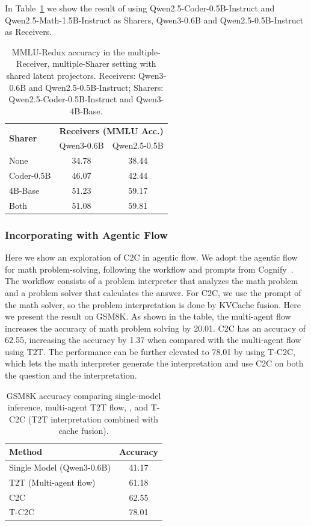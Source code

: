 In Table~\ref{tab:mrms} we show the result of using Qwen2.5-Coder-0.5B-Instruct and Qwen2.5-Math-1.5B-Instruct as Sharers, Qwen3-0.6B and Qwen2.5-0.5B-Instruct as Receivers.

\begin{table}[t]
\centering
\caption{MMLU-Redux accuracy in the multiple-Receiver, multiple-Sharer setting with shared latent projectors. Receivers: Qwen3-0.6B and Qwen2.5-0.5B-Instruct; Sharers: Qwen2.5-Coder-0.5B-Instruct and Qwen3-4B-Base.}
\label{tab:mrms}
\begin{tabular}{l|cc}
\toprule
\multirow{2}{*}{\textbf{Sharer}} & \multicolumn{2}{c}{\textbf{Receivers (MMLU Acc.)}} \\
 & Qwen3-0.6B & Qwen2.5-0.5B \\
\midrule
None & 34.78 & 38.44 \\
Coder-0.5B & 46.07 & 42.44 \\
4B-Base & 51.23 & 59.17 \\
Both & 51.08 & 59.81 \\
\bottomrule
\end{tabular}
\end{table}

\subsubsection{Incorporating with Agentic Flow}
\label{sec:appendix/agentic}

Here we show an exploration of C2C in agentic flow. We adopt the agentic flow for math problem-solving, following the workflow and prompts from Cognify~\citep{he2025cognify}. The workflow consists of a problem interpreter that analyzes the math problem and a problem solver that calculates the answer. For C2C, we use the prompt of the math solver, so the problem interpretation is done by KVCache fusion. Here we present the result on GSM8K. As shown in the table, the multi-agent flow increases the accuracy of math problem solving by 20.01. C2C has an accuracy of 62.55, increasing the accuracy by 1.37 when compared with the multi-agent flow using T2T. The performance can be further elevated to 78.01 by using T-C2C, which lets the math interpreter generate the interpretation and use C2C on both the question and the interpretation. 


\begin{table}[t]
\centering
\caption{GSM8K accuracy comparing single-model inference, multi-agent T2T flow, \name, and T-C2C (T2T interpretation combined with \name cache fusion).}
\label{tab:agentic}
\begin{tabular}{l|c}
\toprule
Method & Accuracy \\
\midrule
Single Model (Qwen3-0.6B) & 41.17 \\
T2T (Multi-agent flow) & 61.18 \\
C2C & 62.55 \\
T-C2C & 78.01 \\
\bottomrule
\end{tabular}
\end{table}




